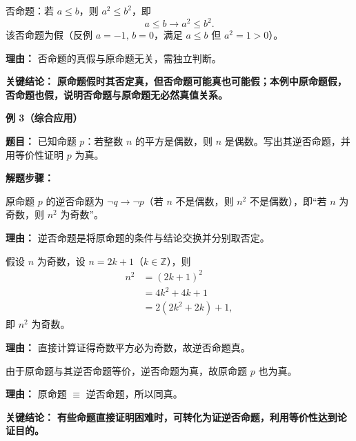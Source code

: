 \begin{examplebox}
\begin{description}[style=nextline, leftmargin=2.8em, labelsep=0.5em, itemsep=0.45em]
		\item[\textbf{第三步（否命题判真假）：}] 否命题：若 $a\leq b$，则 $a^2\leq b^2$，即
			\[
				a\leq b \to a^2\leq b^2.
			\]
			该否命题为假（反例 $a=-1,\,b=0$，满足 $a\leq b$ 但 $a^2=1>0$）。
			\par\textbf{理由：}
			否命题的真假与原命题无关，需独立判断。
	\end{description}

	\textbf{\textcolor{CExample}{关键结论：}}
	\textbf{原命题假时其否定真，但否命题可能真也可能假；本例中原命题假，否命题也假，说明否命题与原命题无必然真值关系。}

	\medskip
	\textbf{\textcolor{CExample}{例 3（综合应用）}}

	\textbf{\textcolor{CExample}{题目：}}
	已知命题 $p$：若整数 $n$ 的平方是偶数，则 $n$ 是偶数。写出其逆否命题，并用等价性证明 $p$ 为真。

	\textbf{\textcolor{CExample}{解题步骤：}}
	\begin{description}[style=nextline, leftmargin=2.8em, labelsep=0.5em, itemsep=0.45em]
		\item[\textbf{第一步（写出逆否命题）：}] 原命题 $p$ 的逆否命题为 $\lnot q\to\lnot p$（若 $n$ 不是偶数，则 $n^2$ 不是偶数），即“若 $n$ 为奇数，则 $n^2$ 为奇数”。
			\par\textbf{理由：}
			逆否命题是将原命题的条件与结论交换并分别取否定。

		\item[\textbf{第二步（证明逆否命题）：}] 假设 $n$ 为奇数，设 $n=2k+1$（$k\in\mathbb{Z}$），则
			\[
				\begin{aligned}
					n^2 &= (2k+1)^2 \\
					&= 4k^2+4k+1 \\
					&= 2(2k^2+2k)+1,
			\end{aligned}
			\]
			即 $n^2$ 为奇数。
			\par\textbf{理由：}
			直接计算证得奇数平方必为奇数，故逆否命题真。

		\item[\textbf{第三步（等价回归）：}] 由于原命题与其逆否命题等价，逆否命题为真，故原命题 $p$ 也为真。
			\par\textbf{理由：}
			原命题 $\equiv$ 逆否命题，所以同真。
	\end{description}

	\textbf{\textcolor{CExample}{关键结论：}}
	\textbf{有些命题直接证明困难时，可转化为证逆否命题，利用等价性达到论证目的。}
\end{examplebox}
